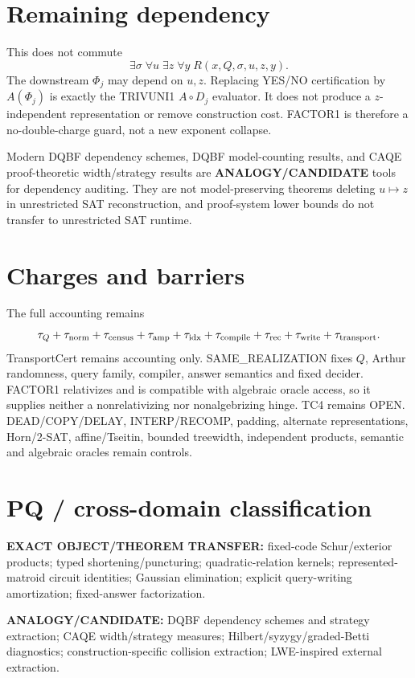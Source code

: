 \documentclass[11pt]{article}
\begin{document}
\section*{Remaining dependency}
This does not commute
\[
\boxed{\exists\sigma\;\forall u\;\exists z\;\forall y\;R(x,Q,\sigma,u,z,y).}
\]
The downstream \(\Phi_j\) may depend on \(u,z\). Replacing YES/NO certification by \(A(\Phi_j)\) is exactly the TRIVUNI1 \(A\circ D_j\) evaluator. It does not produce a \(z\)-independent representation or remove construction cost. FACTOR1 is therefore a no-double-charge guard, not a new exponent collapse.

Modern DQBF dependency schemes, DQBF model-counting results, and CAQE proof-theoretic width/strategy results are \textbf{ANALOGY/CANDIDATE} tools for dependency auditing. They are not model-preserving theorems deleting \(u\mapsto z\) in unrestricted SAT reconstruction, and proof-system lower bounds do not transfer to unrestricted SAT runtime.

\section*{Charges and barriers}
The full accounting remains
\[
\tau_Q+\tau_{\rm norm}+\tau_{\rm census}+\tau_{\rm amp}
+\tau_{\rm idx}+\tau_{\rm compile}+\tau_{\rm rec}
+\tau_{\rm write}+\tau_{\rm transport}.
\]
TransportCert remains accounting only. SAME\_REALIZATION fixes \(Q\), Arthur randomness, query family, compiler, answer semantics and fixed decider. FACTOR1 relativizes and is compatible with algebraic oracle access, so it supplies neither a nonrelativizing nor nonalgebrizing hinge. TC4 remains OPEN. DEAD/COPY/DELAY, INTERP/RECOMP, padding, alternate representations, Horn/2-SAT, affine/Tseitin, bounded treewidth, independent products, semantic and algebraic oracles remain controls.

\section*{PQ / cross-domain classification}
\textbf{EXACT OBJECT/THEOREM TRANSFER:} fixed-code Schur/exterior products; typed shortening/puncturing; quadratic-relation kernels; represented-matroid circuit identities; Gaussian elimination; explicit query-writing amortization; fixed-answer factorization.

\textbf{ANALOGY/CANDIDATE:} DQBF dependency schemes and strategy extraction; CAQE width/strategy measures; Hilbert/syzygy/graded-Betti diagnostics; construction-specific collision extraction; LWE-inspired external extraction.
\end{document}
